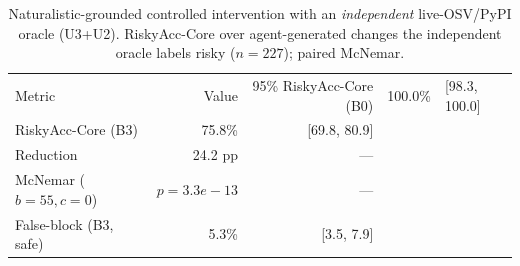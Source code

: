\begin{table}[t]\centering
\caption{Naturalistic-grounded controlled intervention with an \emph{independent} live-OSV/PyPI oracle (U3+U2). RiskyAcc-Core over agent-generated changes the independent oracle labels risky ($n=227$); paired McNemar.}
\label{tab:e1a-indep}
\begin{tabular}{lrr}
\toprule
Metric & Value & 95\%%
\midrule
RiskyAcc-Core (B0) & 100.0\% & [98.3, 100.0] \\
RiskyAcc-Core (B3) & 75.8\% & [69.8, 80.9] \\
Reduction & 24.2 pp & --- \\
McNemar ($b{=}55,c{=}0$) & $p{=}3.3e-13$ & --- \\
False-block (B3, safe) & 5.3\% & [3.5, 7.9] \\
\bottomrule
\end{tabular}
\end{table}
